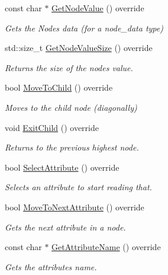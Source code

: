 \begin{DoxyCompactItemize}
const char $\ast$ \mbox{\hyperlink{classtestAnalyser2_1_1RapidAbstract_a80bd2529fc3b0d6678a166d3192d4a60}{Get\+Node\+Value}} () override
\begin{DoxyCompactList}\small\item\em Gets the Node\textquotesingle{}s data (for a node\+\_\+data type) \end{DoxyCompactList}\item 
std\+::size\+\_\+t \mbox{\hyperlink{classtestAnalyser2_1_1RapidAbstract_a04603ede543eac5c9c76050cbfe768db}{Get\+Node\+Value\+Size}} () override
\begin{DoxyCompactList}\small\item\em Returns the size of the nodes value. \end{DoxyCompactList}\item 
bool \mbox{\hyperlink{classtestAnalyser2_1_1RapidAbstract_af54437d66d9120ab274569efa1a51873}{Move\+To\+Child}} () override
\begin{DoxyCompactList}\small\item\em Moves to the child node (diagonally) \end{DoxyCompactList}\item 
void \mbox{\hyperlink{classtestAnalyser2_1_1RapidAbstract_a2288aec3d37a6c3802a1c7f6e76084b3}{Exit\+Child}} () override
\begin{DoxyCompactList}\small\item\em Returns to the previous highest node. \end{DoxyCompactList}\item 
bool \mbox{\hyperlink{classtestAnalyser2_1_1RapidAbstract_a5ca627c1c860c9f5ff58cb6bf612fe81}{Select\+Attribute}} () override
\begin{DoxyCompactList}\small\item\em Selects an attribute to start reading that. \end{DoxyCompactList}\item 
bool \mbox{\hyperlink{classtestAnalyser2_1_1RapidAbstract_a406f500d326f20c768abffb9e6318616}{Move\+To\+Next\+Attribute}} () override
\begin{DoxyCompactList}\small\item\em Gets the next attribute in a node. \end{DoxyCompactList}\item 
const char $\ast$ \mbox{\hyperlink{classtestAnalyser2_1_1RapidAbstract_aa7dd98c70db7f68528247a08717178ab}{Get\+Attribute\+Name}} () override
\begin{DoxyCompactList}\small\item\em Gets the attribute\textquotesingle{}s name. \end{DoxyCompactList}\item 

\end{DoxyCompactItemize}
